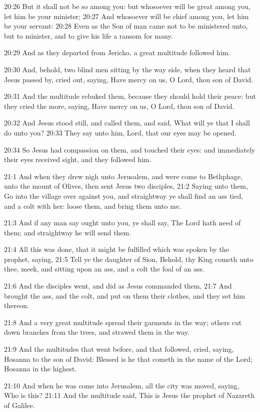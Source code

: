 20:26 But it shall not be so among you: but whosoever will be great among you, let him be your minister; 20:27 And whosoever will be chief among you, let him be your servant: 20:28 Even as the Son of man came not to be ministered unto, but to minister, and to give his life a ransom for many.

20:29 And as they departed from Jericho, a great multitude followed him.

20:30 And, behold, two blind men sitting by the way side, when they heard that Jesus passed by, cried out, saying, Have mercy on us, O Lord, thou son of David.

20:31 And the multitude rebuked them, because they should hold their peace: but they cried the more, saying, Have mercy on us, O Lord, thou son of David.

20:32 And Jesus stood still, and called them, and said, What will ye that I shall do unto you?  20:33 They say unto him, Lord, that our eyes may be opened.

20:34 So Jesus had compassion on them, and touched their eyes: and immediately their eyes received sight, and they followed him.

21:1 And when they drew nigh unto Jerusalem, and were come to Bethphage, unto the mount of Olives, then sent Jesus two disciples, 21:2 Saying unto them, Go into the village over against you, and straightway ye shall find an ass tied, and a colt with her: loose them, and bring them unto me.

21:3 And if any man say ought unto you, ye shall say, The Lord hath need of them; and straightway he will send them.

21:4 All this was done, that it might be fulfilled which was spoken by the prophet, saying, 21:5 Tell ye the daughter of Sion, Behold, thy King cometh unto thee, meek, and sitting upon an ass, and a colt the foal of an ass.

21:6 And the disciples went, and did as Jesus commanded them, 21:7 And brought the ass, and the colt, and put on them their clothes, and they set him thereon.

21:8 And a very great multitude spread their garments in the way; others cut down branches from the trees, and strawed them in the way.

21:9 And the multitudes that went before, and that followed, cried, saying, Hosanna to the son of David: Blessed is he that cometh in the name of the Lord; Hosanna in the highest.

21:10 And when he was come into Jerusalem, all the city was moved, saying, Who is this?  21:11 And the multitude said, This is Jesus the prophet of Nazareth of Galilee.

